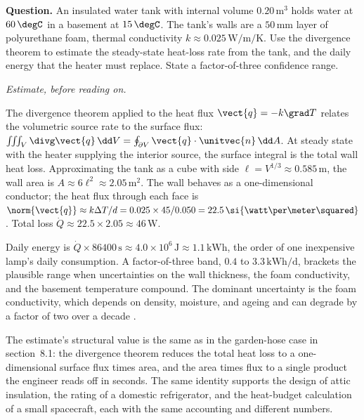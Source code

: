 \begin{estimation}
\textbf{Question.} An insulated water tank with internal volume
$0.20\,\si{\meter\cubed}$ holds water at $60\,\degC$ in a basement at
$15\,\degC$. The tank's walls are a $50\,\si{\milli\meter}$ layer of
polyurethane foam, thermal conductivity $k \approx 0.025\,\si{\watt
\per\meter\per\kelvin}$. Use the divergence theorem to estimate the
steady-state heat-loss rate from the tank, and the daily energy that
the heater must replace. State a factor-of-three confidence range.

\smallskip
\textit{Estimate, before reading on.}

\smallskip
The divergence theorem applied to the heat flux $\vect{q} = -k\grad T$
relates the volumetric source rate to the surface flux:
$\iiint_V \divg\vect{q}\,\dd V = \oint_{\partial V} \vect{q}\cdot
\unitvec{n}\,\dd A$. At steady state with the heater supplying the
interior source, the surface integral is the total wall heat loss.
Approximating the tank as a cube with side $\ell = V^{1/3} \approx
0.585\,\si{\meter}$, the wall area is $A \approx 6\ell^{2} \approx
2.05\,\si{\meter\squared}$. The wall behaves as a one-dimensional
conductor; the heat flux through each face is $\norm{\vect{q}} \approx
k \Delta T / d = 0.025 \times 45 / 0.050 = 22.5\,\si{\watt\per\meter
\squared}$. Total loss $\dot{Q} \approx 22.5 \times 2.05 \approx
46\,\si{\watt}$.

Daily energy is $\dot{Q} \times 86400\,\si{\second} \approx 4.0
\times 10^{6}\,\si{\joule} \approx 1.1\,\si{\kilo\watt\hour}$, the
order of one inexpensive lamp's daily consumption. A factor-of-three
band, $0.4$ to $3.3\,\si{\kilo\watt\hour\per\day}$, brackets the
plausible range when uncertainties on the wall thickness, the foam
conductivity, and the basement temperature compound. The dominant
uncertainty is the foam conductivity, which depends on density,
moisture, and ageing and can degrade by a factor of two over a decade
\cite{text:incropera2007}.

The estimate's structural value is the same as in the garden-hose
case in section~8.1: the divergence theorem reduces the total heat
loss to a one-dimensional surface flux times area, and the area times
flux to a single product the engineer reads off in seconds. The same
identity supports the design of attic insulation, the rating of a
domestic refrigerator, and the heat-budget calculation of a small
spacecraft, each with the same accounting and different numbers.
\end{estimation}

